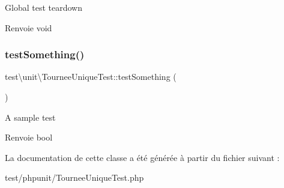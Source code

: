 Global test teardown \begin{DoxyReturn}{Renvoie}
void 
\end{DoxyReturn}
\mbox{\label{classtest_1_1unit_1_1TourneeUniqueTest_a86c9af2a604cbf7428ef4d3704c93f1f}} 
\subsubsection{\texorpdfstring{test\+Something()}{testSomething()}}
{\footnotesize\ttfamily test\textbackslash{}unit\textbackslash{}\+Tournee\+Unique\+Test\+::test\+Something (\begin{DoxyParamCaption}{ }\end{DoxyParamCaption})}

A sample test \begin{DoxyReturn}{Renvoie}
bool 
\end{DoxyReturn}


La documentation de cette classe a été générée à partir du fichier suivant \+:\begin{DoxyCompactItemize}
\item 
test/phpunit/Tournee\+Unique\+Test.\+php\end{DoxyCompactItemize}
